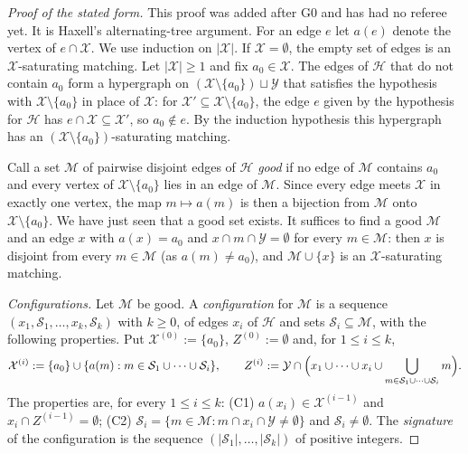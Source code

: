 \begin{proof}[Proof of the stated form]
This proof was added after G0 and has had no referee yet. It is Haxell's
alternating-tree argument. For an edge $e$ let $a(e)$ denote
the vertex of $e\cap\mathcal X$. We use induction on $|\mathcal X|$. If
$\mathcal X=\emptyset$, the empty set of edges is an $\mathcal X$-saturating
matching. Let $|\mathcal X|\ge1$ and fix $a_0\in\mathcal X$. The edges of
$\mathcal H$ that do not contain $a_0$ form a hypergraph on
$(\mathcal X\setminus\{a_0\})\sqcup\mathcal Y$ that satisfies the hypothesis
with $\mathcal X\setminus\{a_0\}$ in place of $\mathcal X$: for
$\mathcal X'\subseteq\mathcal X\setminus\{a_0\}$, the edge $e$ given by the
hypothesis for $\mathcal H$ has $e\cap\mathcal X\subseteq\mathcal X'$, so
$a_0\notin e$. By the induction hypothesis this hypergraph has an
$(\mathcal X\setminus\{a_0\})$-saturating matching.

Call a set $\mathcal M$ of pairwise disjoint edges of $\mathcal H$ \emph{good} if
no edge of $\mathcal M$ contains $a_0$ and every vertex of
$\mathcal X\setminus\{a_0\}$ lies in an edge of $\mathcal M$. Since every edge
meets $\mathcal X$ in exactly one vertex, the map $m\mapsto a(m)$ is then a
bijection from $\mathcal M$ onto $\mathcal X\setminus\{a_0\}$. We have just seen
that a good set exists. It suffices to find a good $\mathcal M$ and an edge $x$
with $a(x)=a_0$ and $x\cap m\cap\mathcal Y=\emptyset$ for every
$m\in\mathcal M$: then $x$ is disjoint from every $m\in\mathcal M$ (as
$a(m)\ne a_0$), and $\mathcal M\cup\{x\}$ is an $\mathcal X$-saturating
matching.

\emph{Configurations.} Let $\mathcal M$ be good. A \emph{configuration} for
$\mathcal M$ is a sequence $(x_1,\mathcal S_1,\dots,x_k,\mathcal S_k)$ with
$k\ge0$, of edges $x_i$ of $\mathcal H$ and sets
$\mathcal S_i\subseteq\mathcal M$, with the following properties. Put
$\mathcal X^{(0)}:=\{a_0\}$, $Z^{(0)}:=\emptyset$ and, for $1\le i\le k$,
\[
\mathcal X^{(i)}:=\{a_0\}\cup\{a(m):m\in\mathcal S_1\cup\dots\cup\mathcal S_i\},
\qquad
Z^{(i)}:=\mathcal Y\cap\Bigl(x_1\cup\dots\cup x_i\cup
\bigcup_{m\in\mathcal S_1\cup\dots\cup\mathcal S_i}m\Bigr).
\]
The properties are, for every $1\le i\le k$: (C1) $a(x_i)\in\mathcal X^{(i-1)}$ and
$x_i\cap Z^{(i-1)}=\emptyset$; (C2)
$\mathcal S_i=\{m\in\mathcal M:m\cap x_i\cap\mathcal Y\ne\emptyset\}$ and
$\mathcal S_i\ne\emptyset$. The \emph{signature} of the configuration is the
sequence $(|\mathcal S_1|,\dots,|\mathcal S_k|)$ of positive integers.


\end{proof}
